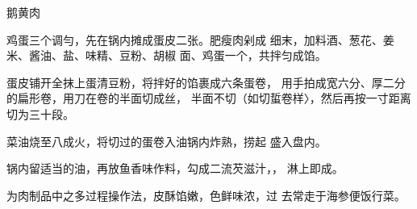 \begin{recipe}{鹅黄肉}

\ingredients


\cooking

\step 鸡蛋三个调勻，先在锅内摊成蛋皮二张。肥瘦肉剁成 细末，加料酒、葱花、姜米、酱油、盐、味精、豆粉、胡椒 面、鸡蛋一个，共拌匀成馅。

\step 	蛋皮铺开全抹上蛋清豆粉，将拌好的馅裹成六条蛋卷， 用手拍成宽六分、厚二分的扁形卷，用刀在卷的半面切成丝， 半面不切（如切蜇卷样〉，然后再按一寸距离切为三十段。

\step 	菜油烧至八成火，将切过的蛋卷入油锅内炸熟，捞起 盛入盘内。

\step 	锅内留适当的油，再放鱼香味作料，勾成二流芡滋汁，， 淋上即成。

\notes

为肉制品中之多过程操作法，皮酥馅嫩，色鲜味浓，过 去常走于海参便饭行菜。

\end{recipe}

